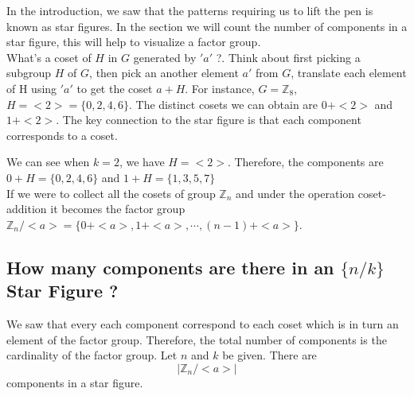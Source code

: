 \documentclass{article}
\begin{document}
In the introduction, we saw that the patterns requiring us to lift the pen is known as star figures. In the section we will count the number of components in a star figure, this will help to visualize a factor group.\\[2mm]
What's a coset of $H$ in $G$ generated by $'a'$ ?. Think about first picking a subgroup $H$ of $G$, then pick an another element $a'$ from $G$, translate each element of H using $'a'$ to get the coset $a + H$. For instance, $G = \mathbb{Z}_8$, $H = <2> = \{0,2,4,6\}$. The distinct cosets we can obtain are $0+<2>$ and $1+ <2>$. The key connection to the star figure is that each component corresponds to a coset. 
\begin{center}
\end{center}
We can see when $k = 2$, we have $H = <2>$. Therefore, the components are $0+ H =\{0,2,4,6\}$ and $1 + H = \{1,3,5,7\}$\\[2mm]
If we were to collect all the cosets of group $\mathbb{Z}_n$ and under the operation coset-addition it becomes the factor group $\mathbb{Z}_n/<a> = \{0 + <a>, 1 + <a>, \cdots , (n-1) + <a>\}$. 

\subsection{How many components are there in an $\{n/k\}$ Star Figure ?}
We saw that every each component correspond to each coset which is in turn an element of the factor group. Therefore, the total number of components is the cardinality of the factor group. Let $n$ and $k$ be given. There are $$|\mathbb{Z}_n/<a>|$$ components in a star figure.
\end{document}
